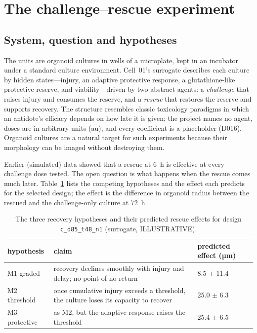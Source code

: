 \documentclass[10pt,a4paper]{article}
\begin{document}
\section{The challenge--rescue experiment}\label{sec:case}
\subsection{System, question and hypotheses}
The units are organoid cultures in wells of a microplate, kept in an incubator under a standard culture environment.
Cell~01's surrogate describes each culture by hidden states---injury, an adaptive protective response, a
glutathione-like protective reserve, and viability---driven by two abstract agents: a \emph{challenge} that raises
injury and consumes the reserve, and a \emph{rescue} that restores the reserve and supports recovery. The structure
resembles classic toxicology paradigms in which an antidote's efficacy depends on how late it is given; the project
names no agent, doses are in arbitrary units (au), and every coefficient is a placeholder (D016). Organoid cultures
\citep{sato2009} are a natural target for such experiments because their morphology can be imaged without
destroying them.

Earlier (simulated) data showed that a rescue at 6~h is effective at every challenge dose tested. The open question is
what happens when the rescue comes much later. Table~\ref{tab:hyp} lists the competing hypotheses and the effect each
predicts for the selected design; the effect is the difference in organoid radius between the rescued and the
challenge-only culture at 72~h.

\begin{table}[tbp]\centering\small
\caption{The three recovery hypotheses and their predicted rescue effects for design \texttt{c\_\allowbreak{}d85\_\allowbreak{}t48\_\allowbreak{}n1} (surrogate, ILLUSTRATIVE).}\label{tab:hyp}
\begin{tabularx}{\linewidth}{@{}p{2.4cm}Xp{2.6cm}@{}}\toprule hypothesis & claim & predicted effect (µm) \\ \midrule
M1 graded & recovery declines smoothly with injury and delay; no point of no return & 8.5 $\pm$ 11.4 \\
M2 threshold & once cumulative injury exceeds a threshold, the culture loses its capacity to recover & 25.0 $\pm$ 6.3 \\
M3 protective & as M2, but the adaptive response raises the threshold & 25.4 $\pm$ 6.5 \\
\bottomrule\end{tabularx}\end{table}
\end{document}
